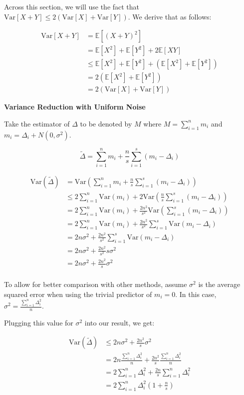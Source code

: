 \documentclass[11pt]{article}
\newcommand{\subsubsubsection}[1]{
  \vspace{1em} %
  \noindent\textbf{#1} %
  \vspace{0.5em} %
}
\begin{document}
Across this section, we will use the fact that $\mathrm{Var}[X+Y] \leq 2(\mathrm{Var}[X] + \mathrm{Var}[Y])$. We derive that as follows:

\[
\begin{aligned}
    \mathrm{Var}[X+Y] &= \mathbb{E}[(X+Y)^2] \\
    &= \mathbb{E}[X^2] + \mathbb{E}[Y^2] + 2\mathbb{E}[XY] \\
    &\leq \mathbb{E}[X^2] + \mathbb{E}[Y^2] + (\mathbb{E}[X^2] + \mathbb{E}[Y^2]) \\
    &= 2(\mathbb{E}[X^2] + \mathbb{E}[Y^2]) \\
    &= 2(\mathrm{Var}[X] + \mathrm{Var}[Y])
\end{aligned}
\]

\subsubsubsection{Variance Reduction with Uniform Noise}

Take the estimator of $\Delta$ to be denoted by $M$ where $M = \sum_{i = 1}^{n} m_i$ and $m_i = \Delta_i + N(0, \sigma^2)$.

\[
\tilde{\Delta} = \sum_{i = 1}^{n} m_i + \frac{n}{s} \sum_{i = 1}^{s} (m_i - \Delta_i)
\]

\[
\begin{aligned}
\mathrm{Var}(\tilde{\Delta}) &= \mathrm{Var}( \sum_{i = 1}^{n} m_i + \frac{n}{s} \sum_{i = 1}^{s} (m_i - \Delta_i)) \\
&\leq 2\sum_{i = 1}^{n} \mathrm{Var}(m_i) + 2\mathrm{Var}(\frac{n}{s} \sum_{i = 1}^{s} (m_i - \Delta_i)) \\
&= 2\sum_{i = 1}^{n} \mathrm{Var}(m_i) + \frac{2n^2}{s^2} \mathrm{Var}(\sum_{i = 1}^{s} (m_i - \Delta_i)) \\
&= 2\sum_{i = 1}^{n} \mathrm{Var}(m_i) + \frac{2n^2}{s^2} \sum_{i = 1}^{s} \mathrm{Var}(m_i - \Delta_i) \\
&= 2n \sigma^2 + \frac{2n^2}{s^2} \sum_{i = 1}^{s} \mathrm{Var}(m_i - \Delta_i) \\
&= 2n \sigma^2 + \frac{2n^2}{s^2} s \sigma^2 \\
&= 2n \sigma^2 + \frac{2n^2}{s} \sigma^2 \\
\end{aligned}
\]

To allow for better comparison with other methods, assume $\sigma^2$ is the average squared error when using the trivial predictor of $m_i = 0$.
In this case, $\sigma^2 = \frac{\sum_{i = 1}^{n}\Delta_i^2}{n}$.

Plugging this value for $\sigma^2$ into our result, we get:

\[
\begin{aligned}
\mathrm{Var}(\tilde{\Delta}) &\leq 2n \sigma^2 + \frac{2n^2}{s} \sigma^2 \\
&= 2n \frac{\sum_{i = 1}^{n}\Delta_i^2}{n} + \frac{2n^2}{s} \frac{\sum_{i = 1}^{n}\Delta_i^2}{n} \\
&= 2\sum_{i = 1}^{n}\Delta_i^2 + \frac{2n}{s} \sum_{i = 1}^{n}\Delta_i^2 \\
&= 2\sum_{i = 1}^{n}\Delta_i^2(1 + \frac{n}{s}) \\
\end{aligned}
\]
\end{document}
